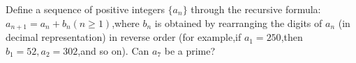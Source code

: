 Define a sequence of positive integers $\{a_n\}$ through the recursive formula:
$a_{n+1}=a_n+b_n(n\ge 1)$,where $b_n$ is obtained by rearranging the digits of $a_n$ (in decimal representation) in reverse order (for example,if $a_1=250$,then $b_1=52,a_2=302$,and so on). Can $a_7$ be a prime?